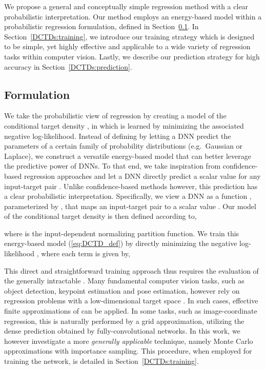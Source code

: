 \documentclass[runningheads]{llncs}
\begin{document}
We propose a general and conceptually simple regression method with a clear probabilistic interpretation. Our method employs an energy-based model within a probabilistic regression formulation, defined in Section~\ref{DCTDs:formulation}. In Section~\ref{DCTDs:training}, we introduce our training strategy which is designed to be simple, yet highly effective and applicable to a wide variety of regression tasks within computer vision. Lastly, we describe our prediction strategy for high accuracy in Section~\ref{DCTDs:prediction}.

\subsection{Formulation}
\label{DCTDs:formulation}
We take the probabilistic view of regression by creating a model  of the conditional target density , in which  is learned by minimizing the associated negative log-likelihood. Instead of defining  by letting a DNN predict the parameters of a certain family of probability distributions (e.g.\ Gaussian or Laplace), we construct a versatile energy-based model that can better leverage the predictive power of DNNs. To that end, we take inspiration from confidence-based regression approaches and let a DNN directly predict a scalar value for any input-target pair . Unlike confidence-based methods however, this prediction has a clear probabilistic interpretation. Specifically, we view a DNN as a function , parameterized by , that maps an input-target pair  to a scalar value . Our model  of the conditional target density  is then defined according to,

where  is the input-dependent normalizing partition function. We train this energy-based model (\ref{eq:DCTD_def}) by directly minimizing the negative log-likelihood , where each term is given by,

This direct and straightforward training approach thus requires the evaluation of the generally intractable . Many fundamental computer vision tasks, such as object detection, keypoint estimation and pose estimation, however rely on regression problems with a low-dimensional target space . In such cases, effective finite approximations of  can be applied. In some tasks, such as image-coordinate regression, this is naturally performed by a grid approximation, utilizing the dense prediction obtained by fully-convolutional networks. In this work, we however investigate a more \emph{generally applicable} technique, namely Monte Carlo approximations with importance sampling. This procedure, when employed for training the network, is detailed in Section~\ref{DCTDs:training}.
\end{document}
